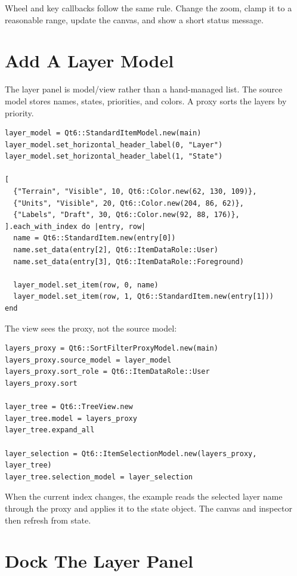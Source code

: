 Wheel and key callbacks follow the same rule. Change the zoom, clamp it to a reasonable range, update the canvas, and show a short status message.

\section{Add A Layer Model}

The layer panel is model/view rather than a hand-managed list. The source model stores names, states, priorities, and colors. A proxy sorts the layers by priority.

\begin{lstlisting}[style=crystal]
layer_model = Qt6::StandardItemModel.new(main)
layer_model.set_horizontal_header_label(0, "Layer")
layer_model.set_horizontal_header_label(1, "State")

[
  {"Terrain", "Visible", 10, Qt6::Color.new(62, 130, 109)},
  {"Units", "Visible", 20, Qt6::Color.new(204, 86, 62)},
  {"Labels", "Draft", 30, Qt6::Color.new(92, 88, 176)},
].each_with_index do |entry, row|
  name = Qt6::StandardItem.new(entry[0])
  name.set_data(entry[2], Qt6::ItemDataRole::User)
  name.set_data(entry[3], Qt6::ItemDataRole::Foreground)

  layer_model.set_item(row, 0, name)
  layer_model.set_item(row, 1, Qt6::StandardItem.new(entry[1]))
end
\end{lstlisting}

The view sees the proxy, not the source model:

\begin{lstlisting}[style=crystal]
layers_proxy = Qt6::SortFilterProxyModel.new(main)
layers_proxy.source_model = layer_model
layers_proxy.sort_role = Qt6::ItemDataRole::User
layers_proxy.sort

layer_tree = Qt6::TreeView.new
layer_tree.model = layers_proxy
layer_tree.expand_all

layer_selection = Qt6::ItemSelectionModel.new(layers_proxy, layer_tree)
layer_tree.selection_model = layer_selection
\end{lstlisting}

When the current index changes, the example reads the selected layer name through the proxy and applies it to the state object. The canvas and inspector then refresh from state.

\section{Dock The Layer Panel}


